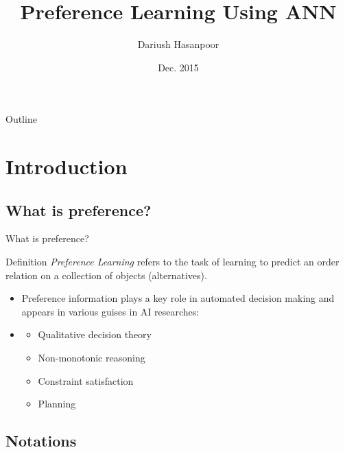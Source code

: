 \documentclass[8pt]{beamer}
\title[\scalebox{.8}{Preference Learning Using ANN}]{Preference Learning Using ANN}
\author[\scalebox{.8}{Dariush Hasanpoor}]{Dariush Hasanpoor}
\institute[]{Isfahan University Of Technology}
\date[\scalebox{.8}{Dec. 2015}]{Dec. 2015}
\makeatletter
\newcommand{\Ytri}{$\triangleright$ }
\renewcommand{\|}[1][.3em]{\hspace{#1}|\hspace{#1}}
\renewcommand{\,}[1][.3em]{,\hspace{#1}}
\def\donotresetequations{{%
    \let\@@elt\relax
    \def\@elt##1{%
        \expandafter\ifx\csname ##1\endcsname\c@equation%
        \else%
            \@@elt {##1}%
        \fi%
    }%
    \edef\beamer@overlaycounterresets{\beamer@overlaycounterresets}%
    \let\@elt\relax%
    \def\@@elt{\@elt}%
    \xdef\beamer@overlaycounterresets{\beamer@overlaycounterresets}%
}}
\newlength{\wideitemsep}
\let\olditem\item
\renewcommand{\item}{\setlength{\itemsep}{\wideitemsep}\olditem}
\newcommand{\subitem}{\item[\Ytri]}
\newcommand{\Cpl}{\emph{Preference Learning} }
\renewcommand{\,}{,\hspace{3pt}}
\renewcommand{\|}{\hspace{3pt}|\hspace{3pt}}
\makeatother
\begin{document}
\donotresetequations

\begin{frame}
  \titlepage
\end{frame}

\begin{frame}{Outline}
  \tableofcontents[hideallsubsections]
\end{frame}

\section{Introduction}
\frame{\tableofcontents[currentsection]}
\subsection{What is preference?}

\begin{frame}{What is preference?}

	\begin{block}{Definition}
	\Cpl refers to the task of learning to predict an order relation on a collection of objects (alternatives).
	\end{block}
    \begin{itemize}
    \item Preference information plays a key role in automated decision making and appears in various guises in AI researches:
    \item[]
        \begin{itemize}
        \subitem Qualitative decision theory
        \subitem Non-monotonic reasoning
        \subitem Constraint satisfaction
        \subitem Planning
        \end{itemize}
    \end{itemize}
\end{frame}

\subsection{Notations}
\end{document}
